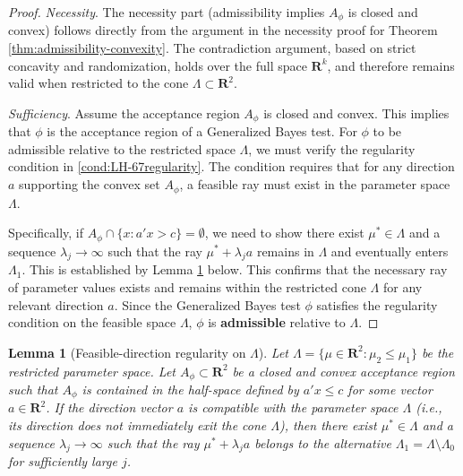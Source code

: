 \documentclass[12pt]{article}
\newtheorem{lemma}{Lemma}
\theoremstyle{definition}
\theoremstyle{remark}
\begin{document}
\begin{proof}
\emph{Necessity}. The necessity part (admissibility implies $A_\phi$ is closed and convex) follows directly from the argument in the necessity proof for Theorem \ref{thm:admissibility-convexity}. The contradiction argument, based on strict concavity and randomization, holds over the full space $\mathbf{R}^k$, and therefore remains valid when restricted to the cone $\Lambda \subset \mathbf{R}^2$.

\emph{Sufficiency}. Assume the acceptance region $A_\phi$ is closed and convex. This implies that $\phi$ is the acceptance region of a Generalized Bayes test. For $\phi$ to be admissible relative to the restricted space $\Lambda$, we must verify the regularity condition in \eqref{cond:LH-67regularity}. The condition requires that for any direction $a$ supporting the convex set $A_\phi$, a feasible ray must exist in the parameter space $\Lambda$.

Specifically, if $A_\phi\cap\{x:a'x>c\}=\emptyset$, we need to show there exist $\mu^* \in \Lambda$ and a sequence $\lambda_j \to \infty$ such that the ray $\mu^*+\lambda_j a$ remains in $\Lambda$ and eventually enters $\Lambda_1$. This is established by Lemma \ref{lem:feasible-regularity} below. This  confirms that the necessary ray of parameter values exists and remains within the restricted cone $\Lambda$ for any relevant direction $a$.
Since the Generalized Bayes test $\phi$ satisfies the regularity condition on the feasible space $\Lambda$, $\phi$ is \textbf{admissible} relative to $\Lambda$.
\end{proof}

\begin{lemma}[Feasible-direction regularity on $\Lambda$]
\label{lem:feasible-regularity}
Let $\Lambda=\{\mu\in\mathbf R^2:\mu_2\le \mu_1\}$ be the restricted parameter space. Let $A_\phi\subset\mathbf R^2$ be a closed and convex acceptance region such that $A_\phi$ is contained in the half-space defined by $a'x \le c$ for some vector $a \in \mathbf{R}^2$. If the direction vector $a$ is compatible with the parameter space $\Lambda$ (i.e., its direction does not immediately exit the cone $\Lambda$),
then there exist $\mu^*\in\Lambda$ and a sequence $\lambda_j\to\infty$ such that the ray $\mu^*+\lambda_j a$ belongs to the alternative $\Lambda_1 = \Lambda \setminus \Lambda_0$ for sufficiently large $j$.
\end{lemma}
\end{document}

